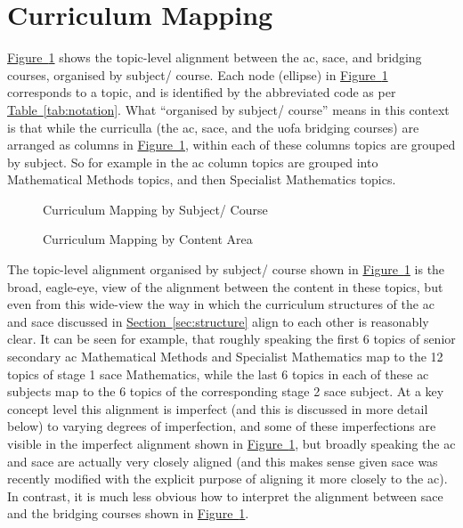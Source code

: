 \documentclass[twoside,12pt,a4paper]{report}
\newcommand{\refsec}[1]{\hyperref[sec:#1]{Section~\ref{sec:#1}}}
\newcommand{\reffig}[1]{\hyperref[fig:#1]{Figure~\ref{fig:#1}}}
\newcommand{\reftab}[1]{\hyperref[tab:#1]{Table~\ref{tab:#1}}}
\begin{document}
\section{Curriculum Mapping}
\label{sec:mapping}

\reffig{mapping} shows the topic-level alignment between the \gls{ac}, \gls{sace}, and bridging courses, organised by subject/ course. Each node (ellipse) in \reffig{mapping} corresponds to a topic, and is identified by the abbreviated code as per \reftab{notation}. What ``organised by subject/ course'' means in this context is that while the curriculla (the \gls{ac}, \gls{sace}, and the \gls{uofa} bridging courses) are arranged as columns in \reffig{mapping}, within each of these columns topics are grouped by subject. So for example in the \gls{ac} column topics are grouped into Mathematical Methods topics, and then Specialist Mathematics topics.

\clearpage

\pagestyle{empty}

\begin{figure}[p]
\begin{center}

\caption{Curriculum Mapping by Subject/ Course\label{fig:mapping}}
\end{center}
\end{figure}

\begin{figure}[p]
\begin{center}

\caption{Curriculum Mapping by Content Area\label{fig:mappingByTopic}}
\end{center}
\end{figure}

\clearpage

\pagestyle{plain}


The topic-level alignment organised by subject/ course shown in \reffig{mapping} is the broad, eagle-eye, view of the alignment between the content in these topics, but even from this wide-view the way in which the curriculum structures of the \gls{ac} and \gls{sace} discussed in \refsec{structure} align to each other is reasonably clear. It can be seen for example, that roughly speaking the first 6 topics of senior secondary \gls{ac} Mathematical Methods and Specialist Mathematics map to the 12 topics of stage 1 \gls{sace} Mathematics, while the last 6 topics in each of these \gls{ac} subjects map to the 6 topics of the corresponding stage 2 \gls{sace} subject. At a key concept level this alignment is imperfect (and this is discussed in more detail below) to varying degrees of imperfection, and some of these imperfections are visible in the imperfect alignment shown in \reffig{mapping}, but broadly speaking the \gls{ac} and \gls{sace} are actually very closely aligned (and this makes sense given \gls{sace} was recently modified with the explicit purpose of aligning it more closely to the \gls{ac}). In contrast, it is much less obvious how to interpret the alignment between \gls{sace} and the bridging courses shown in \reffig{mapping}.
\end{document}
